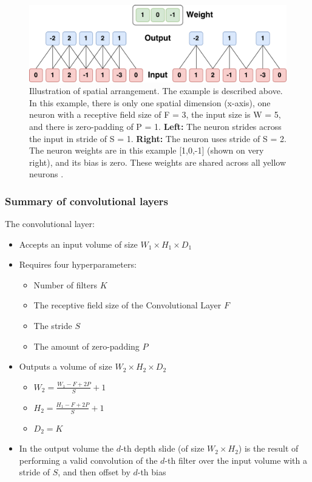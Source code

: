 \begin{figure}[H]
	\centering
	\includegraphics[width=1\textwidth]{Figures/Spatial_size.pdf}
	\caption{Illustration of spatial arrangement. The example is described above. In this example, there is only one spatial dimension (x-axis), one neuron with a receptive field size of F = 3, the input size is W = 5, and there is zero-padding of P = 1. \textbf{Left:} The neuron strides across the input in stride of S = 1. \textbf{Right:} The neuron uses stride of S = 2.
		The neuron weights are in this example [1,0,-1] (shown on very right), and its bias is zero. These weights are shared across all yellow neurons
		 \cite{CNN_course}.
	}
	\label{fig:Spatial_size}
\end{figure} 

\subsubsection{Summary of convolutional layers}
The convolutional layer:
\begin{itemize}
	\item Accepts an input volume of size $W_1 \times  H_1 \times  D_1$
	\item Requires four hyperparameters:
	\begin{itemize}
		\item Number of filters $K$
		\item The receptive field size of the Convolutional Layer $F$ 
		\item The stride $S$
		\item The amount of zero-padding $P$ 
	\end{itemize}
	\item Outputs a volume of size $W_2 \times  H_2 \times  D_2$
	\begin{itemize}
		\item $W_2 = \frac{W_1-F+2P}{S}+1$
		\item $H_2 = \frac{H_1-F+2P}{S}+1$
		\item $D_2 = K$
	\end{itemize}
	\item In the output volume the $d$-th depth slide (of size $W_2 \times  H_2$) is the result of performing a valid convolution of the $d$-th filter over the input volume with a stride of $S$, and then offset by $d$-th bias
\end{itemize}

